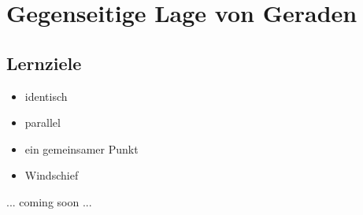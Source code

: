 \section{Gegenseitige Lage von Geraden}

\subsection*{Lernziele}
\begin{itemize}
\item identisch
\item parallel
\item ein gemeinsamer Punkt
\item Windschief
\end{itemize}


... coming soon ...
